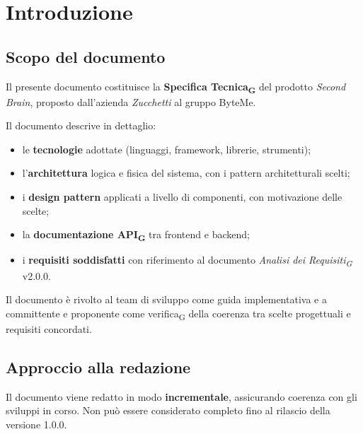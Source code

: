 \documentclass[11pt,a4paper]{article}
\newcommand{\gls}[1]{#1\textsubscript{G}}
\begin{document}
\tableofcontents
\thispagestyle{empty}
\newpage

{} 
\listoffigures 
\newpage

\setcounter{page}{1}

\section{Introduzione}
\subsection{Scopo del documento}
Il presente documento costituisce la \textbf{\gls{Specifica Tecnica}} del prodotto \textit{Second Brain}, proposto dall'azienda \textit{Zucchetti} al gruppo ByteMe.
 
Il documento descrive in dettaglio:
\begin{itemize}
  \item le \textbf{tecnologie} adottate (linguaggi, framework, librerie, strumenti);
  \item l'\textbf{architettura} logica e fisica del sistema, con i pattern architetturali scelti;
  \item i \textbf{design pattern} applicati a livello di componenti, con motivazione delle scelte;
  \item la \textbf{documentazione \gls{API}} tra frontend e backend;
  \item i \textbf{requisiti soddisfatti} con riferimento al documento \textit{\gls{Analisi dei Requisiti}} v2.0.0.
\end{itemize}
 
Il documento è rivolto al team di sviluppo come guida implementativa e a
committente e proponente come \gls{verifica} della coerenza tra scelte progettuali e requisiti concordati.
 
\subsection{Approccio alla redazione}
Il documento viene redatto in modo \textbf{incrementale}, assicurando coerenza con gli sviluppi in corso. Non può essere considerato completo fino al rilascio della versione 1.0.0.
\end{document}
